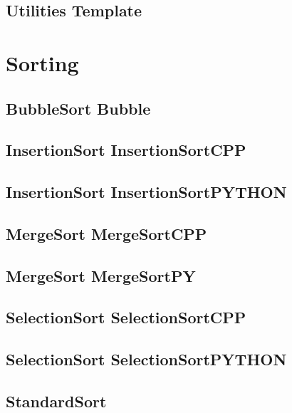 \subsection{Utilities Template}
\raggedbottom
\hrulefill

\section{Sorting}
\subsection{BubbleSort Bubble}
\raggedbottom
\hrulefill
\subsection{InsertionSort InsertionSortCPP}
\raggedbottom
\hrulefill
\subsection{InsertionSort InsertionSortPYTHON}
\raggedbottom
\hrulefill
\subsection{MergeSort MergeSortCPP}
\raggedbottom
\hrulefill
\subsection{MergeSort MergeSortPY}
\raggedbottom
\hrulefill
\subsection{SelectionSort SelectionSortCPP}
\raggedbottom
\hrulefill
\subsection{SelectionSort SelectionSortPYTHON}
\raggedbottom
\hrulefill
\subsection{ StandardSort}
\raggedbottom
\hrulefill

